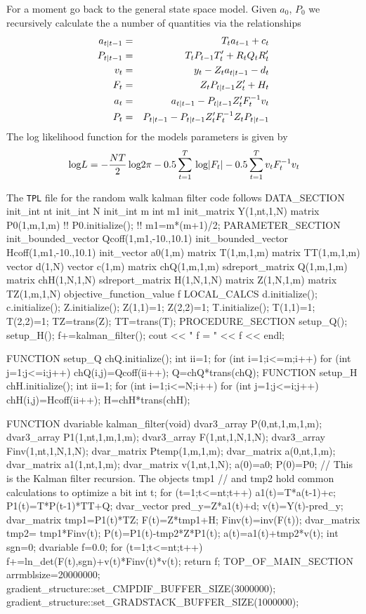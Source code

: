 For a moment go back to the general state space model.
Given $a_0$, $P_0$ we recursively calculate the a number of quantities
via the relationships
 \begin{eqnarray}
      \aone&=&T_ta_{t-1}+c_t\cr
      \Pone&=&T_tP_{t-1}T^\prime_t +R_tQ_tR^\prime_t\cr
      v_t&=&y_t-Z_t\aone-d_t\cr
      F_t&=&Z_t\Pone Z_t^\prime+H_t\cr
      a_t&=&\aone-\Pone Z_t^\prime F_t^{-1}v_t\cr
      P_t&=&\Pone-\Pone Z_t^\prime F_t^{-1}Z_t\Pone
 \end{eqnarray}
The log likelihood function for the models parameters is
given by
$$\log L = -{NT\over 2}\log 2\pi -0.5 \sum_{t=1}^T \log|F_t|
        -0.5 \sum_{t=1}^T v_t F_t^{-1} v_t$$

The {\tt TPL} file for the random walk kalman filter code
follows
\beginexample
DATA_SECTION
  init_int nt
  init_int N
  init_int m
  int m1
  init_matrix Y(1,nt,1,N)
  matrix P0(1,m,1,m)
 !! P0.initialize(); 
 !! m1=m*(m+1)/2; 
PARAMETER_SECTION
  init_bounded_vector Qcoff(1,m1,-10.,10.1)
  init_bounded_vector Hcoff(1,m1,-10.,10.1)
  init_vector a0(1,m)
  matrix T(1,m,1,m)
  matrix TT(1,m,1,m)
  vector d(1,N)
  vector c(1,m)
  matrix chQ(1,m,1,m)
  sdreport_matrix Q(1,m,1,m)
  matrix chH(1,N,1,N)
  sdreport_matrix H(1,N,1,N)
  matrix Z(1,N,1,m)
  matrix TZ(1,m,1,N)
  objective_function_value f
 LOCAL_CALCS
   d.initialize();
   c.initialize();
   Z.initialize();
   Z(1,1)=1; Z(2,2)=1;
   T.initialize();
   T(1,1)=1; T(2,2)=1;
   TZ=trans(Z);
   TT=trans(T);
PROCEDURE_SECTION
  setup_Q();
  setup_H();
  f+=kalman_filter();
  cout << " f = " << f << endl;

FUNCTION setup_Q
  chQ.initialize();
  int ii=1;
  for (int i=1;i<=m;i++)
    for (int j=1;j<=i;j++)
      chQ(i,j)=Qcoff(ii++);
  Q=chQ*trans(chQ);    
FUNCTION setup_H
  chH.initialize();
  int ii=1;
  for (int i=1;i<=N;i++)
    for (int j=1;j<=i;j++)
      chH(i,j)=Hcoff(ii++);
  H=chH*trans(chH);    

FUNCTION dvariable kalman_filter(void)  
  dvar3_array P(0,nt,1,m,1,m);
  dvar3_array P1(1,nt,1,m,1,m);
  dvar3_array F(1,nt,1,N,1,N);
  dvar3_array Finv(1,nt,1,N,1,N);
  dvar_matrix Ptemp(1,m,1,m);
  dvar_matrix a(0,nt,1,m);
  dvar_matrix a1(1,nt,1,m);
  dvar_matrix v(1,nt,1,N);
  a(0)=a0;
  P(0)=P0;
  // This is the Kalman filter recursion. The objects tmp1
  // and tmp2 hold common calculations to optimize a bit
  int t;
  for (t=1;t<=nt;t++)
  {
    a1(t)=T*a(t-1)+c;
    P1(t)=T*P(t-1)*TT+Q;
    dvar_vector pred_y=Z*a1(t)+d;
    v(t)=Y(t)-pred_y;
    dvar_matrix tmp1=P1(t)*TZ;
    F(t)=Z*tmp1+H;
    Finv(t)=inv(F(t));
    dvar_matrix tmp2= tmp1*Finv(t);
    P(t)=P1(t)-tmp2*Z*P1(t);
    a(t)=a1(t)+tmp2*v(t);
  }
  int sgn=0;
  dvariable f=0.0;
  for (t=1;t<=nt;t++)
    f+=ln_det(F(t),sgn)+v(t)*Finv(t)*v(t);
  return f;  
TOP_OF_MAIN_SECTION
  arrmblsize=20000000;
  gradient_structure::set_CMPDIF_BUFFER_SIZE(3000000);
  gradient_structure::set_GRADSTACK_BUFFER_SIZE(1000000);
 
